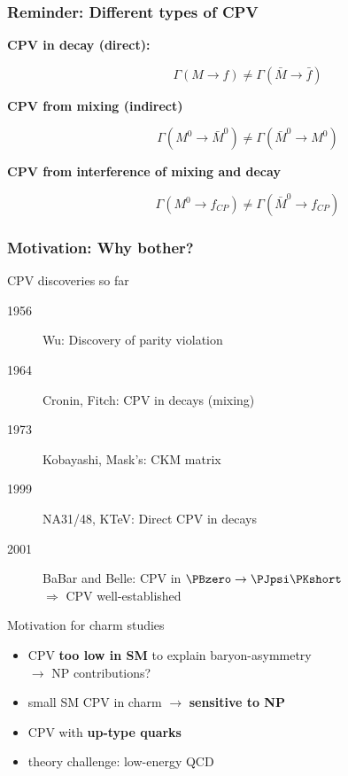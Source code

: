 \documentclass[18pt, aspectratio=169]{beamer}
\newcommand{\kitemph}[1]{\textcolor{kit-green100}{\bf{#1}}}
\begin{document}
\begin{frame}
  \frametitle{Reminder: Different types of CPV}
  \begin{description}
  \item[\textbf{CPV in decay (direct):}]
    \[\Gamma(M \rightarrow f) \neq \Gamma(\bar{M} \rightarrow \bar{f})\]
 \item[\textbf{CPV from mixing (indirect)}]
   \[\Gamma(M^0 \rightarrow \bar{M}^0) \neq \Gamma(\bar{M}^0 \rightarrow M^0)\]
 \item[\textbf{CPV from interference of mixing and decay}]
   \[\Gamma(M^0 \rightarrow f_{CP}) \neq \Gamma(\bar{M}^0 \rightarrow f_{CP})\]
  \end{description}
\end{frame}

\begin{frame}
  \frametitle{Motivation: Why bother?}
  \begin{block}{CPV discoveries so far}
    \begin{description}
    \item[1956] Wu: Discovery of parity violation
    \item[1964] Cronin, Fitch: CPV in \PK decays (mixing)
    \item[1973] Kobayashi, Mask's: CKM matrix
    \item[1999] NA31/48, KTeV: Direct CPV in \PK decays
    \item[2001] BaBar and Belle: CPV in $\PBzero \rightarrow \PJpsi\PKshort$\\
      $\Rightarrow$ CPV well-established
    \end{description}
  \end{block}
  \pause
  \begin{exampleblock}{Motivation for charm studies}
    \begin{itemize}
    \item CPV \kitemph{too low in SM} to explain baryon-asymmetry\\
      $\rightarrow$ NP contributions?
    \item small SM CPV in charm $\rightarrow$ \kitemph{sensitive to NP}
    \item CPV with \kitemph{up-type quarks}
    \item theory challenge: low-energy QCD
    \end{itemize}
  \end{exampleblock}
\end{frame}
\end{document}
